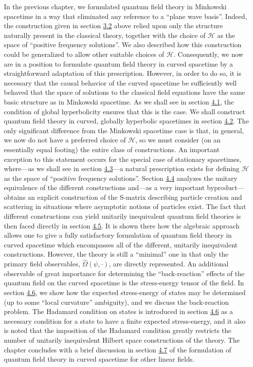 \documentclass[11pt,a4paper]{article}
\begin{document}
In the previous chapter, we formulated quantum field theory in Minkowski spacetime in a way that eliminated any reference to a ``plane wave basis''. Indeed, the construction given in section \hyperlink{sec:3.2}{3.2} above relied upon only the structure naturally present in the classical theory, together with the choice of \(\mathcal{H}\) as the space of ``positive frequency solutions''. We also described how this construction could be generalized to allow other suitable choices of \(\mathcal{H}\). Consequently, we now are in a position to formulate quantum field theory in curved spacetime by a straightforward adaptation of this prescription. However, in order to do so, it is necessary that the causal behavior of the curved spacetime be sufficiently well behaved that the space of solutions to the classical field equations have the same basic structure as in Minkowski spacetime. As we shall see in section \hyperlink{sec:4.1}{4.1}, the condition of global hyperbolicity ensures that this is the case. We shall construct quantum field theory in curved, globally hyperbolic spacetimes in section \hyperlink{sec:4.2}{4.2}. The only significant difference from the Minkowski spacetime case is that, in general, we now do not have a preferred choice of \(\mathcal{H}\), so we must consider (on an essentially equal footing) the entire class of constructions. An important exception to this statement occurs for the special case of stationary spacetimes, where---as we shall see in section \hyperlink{sec:4.3}{4.3}---a natural prescription exists for defining \(\mathcal{H}\) as the space of ``positive frequency solutions''. Section \hyperlink{sec:4.4}{4.4} analyzes the unitary equivalence of the different constructions and---as a very important byproduct---obtains an explicit construction of the S-matrix describing particle creation and scattering in situations where asymptotic notions of particles exist. The fact that different constructions can yield unitarily inequivalent quantum field theories is then faced directly in section \hyperlink{sec:4.5}{4.5}. It is shown there how the algebraic approach allows one to give a fully satisfactory formulation of quantum field theory in curved spacetime which encompasses all of the different, unitarily inequivalent constructions. However, the theory is still a ``minimal'' one in that only the primary field observables, \(\hat{\Omega}(\psi,\cdot)\), are \hypertarget{source-67}{}directly represented. An additional observable of great importance for determining the ``back-reaction'' effects of the quantum field on the curved spacetime is the stress-energy tensor of the field. In section \hyperlink{sec:4.6}{4.6}, we show how the expected stress-energy of states may be determined (up to some ``local curvature'' ambiguity), and we discuss the back-reaction problem. The Hadamard condition on states is introduced in section \hyperlink{sec:4.6}{4.6} as a necessary condition for a state to have a finite expected stress-energy, and it also is noted that the imposition of the Hadamard condition greatly restricts the number of unitarily inequivalent Hilbert space constructions of the theory. The chapter concludes with a brief discussion in section \hyperlink{sec:4.7}{4.7} of the formulation of quantum field theory in curved spacetime for other linear fields.
\end{document}
